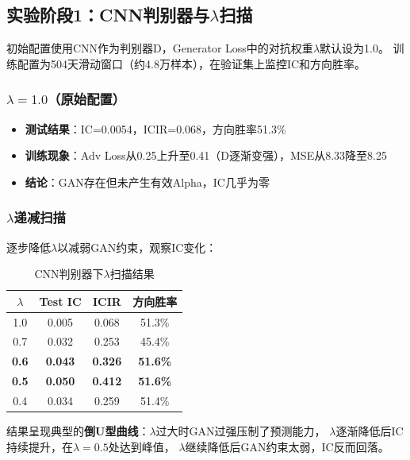 \documentclass[12pt,a4paper]{ctexart}
\begin{document}
\subsection{实验阶段1：CNN判别器与$\lambda$扫描}

初始配置使用CNN作为判别器D，Generator Loss中的对抗权重$\lambda$默认设为1.0。
训练配置为504天滑动窗口（约4.8万样本），在验证集上监控IC和方向胜率。

\subsubsection{$\lambda=1.0$（原始配置）}

\begin{itemize}[leftmargin=*]
    \item \textbf{测试结果}：IC=0.0054，ICIR=0.068，方向胜率51.3\%
    \item \textbf{训练现象}：Adv Loss从0.25上升至0.41（D逐渐变强），MSE从8.33降至8.25
    \item \textbf{结论}：GAN存在但未产生有效Alpha，IC几乎为零
\end{itemize}

\subsubsection{$\lambda$递减扫描}

逐步降低$\lambda$以减弱GAN约束，观察IC变化：

\begin{table}[htbp]
\centering
\caption{CNN判别器下$\lambda$扫描结果}
\label{tab:gan_lambda_scan}
\begin{tabular}{cccc}
\toprule
$\lambda$ & Test IC & ICIR & 方向胜率 \\
\midrule
1.0 & 0.005 & 0.068 & 51.3\% \\
0.7 & 0.032 & 0.253 & 45.4\% \\
\textbf{0.6} & \textbf{0.043} & \textbf{0.326} & \textbf{51.6\%} \\
\textbf{0.5} & \textbf{0.050} & \textbf{0.412} & \textbf{51.6\%} \\
0.4 & 0.034 & 0.259 & 51.4\% \\
\bottomrule
\end{tabular}
\end{table}

结果呈现典型的\textbf{倒U型曲线}：$\lambda$过大时GAN过强压制了预测能力，
$\lambda$逐渐降低后IC持续提升，在$\lambda=0.5$处达到峰值，
$\lambda$继续降低后GAN约束太弱，IC反而回落。
\end{document}
